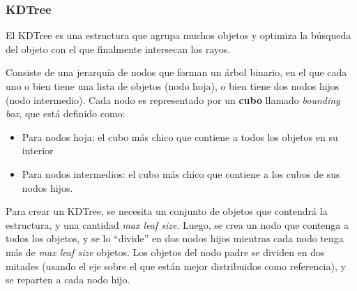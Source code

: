 \subsubsection{KDTree}

El KDTree es una estructura que agrupa muchos objetos y optimiza la búsqueda del
objeto con el que finalmente intersecan los rayos.

Consiste de una jerarquía de nodos que forman un árbol binario, en el que cada
uno o bien tiene una lista de objetos (nodo hoja), o bien tiene dos nodos hijos
(nodo intermedio). Cada nodo es representado por un \textbf{cubo} llamado
\textit{bounding box}, que está definido como:

\begin{itemize}
  \item Para nodos hoja: el cubo más chico que contiene a todos los objetos en su interior
  \item Para nodos intermedios: el cubo más chico que contiene a los cubos de
        sus nodos hijos.
\end{itemize}

Para crear un KDTree, se necesita un conjunto de objetos que contendrá la
estructura, y una cantidad \textit{max leaf size}. Luego, se crea un nodo que
contenga a todos los objetos, y se lo ``divide'' en dos nodos hijos mientras
cada nodo tenga más de \textit{max leaf size} objetos. Los objetos del nodo
padre se dividen en dos mitades (usando el eje sobre el que están mejor
distribuidos como referencia), y se reparten a cada nodo hijo.

